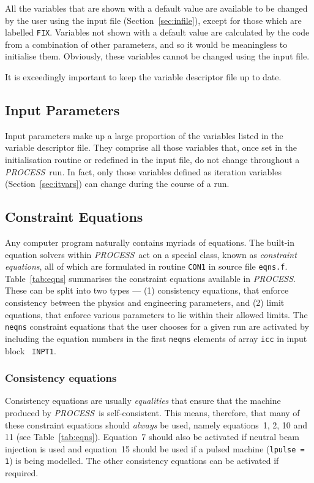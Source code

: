 \documentclass[11pt,a4paper]{report}
\makeatletter
\newcommand{\PS}{\mbox{\it PROCESS\/ }}
\newcommand{\PSD}{\mbox{\it PROCESS}\@.\/ }
\makeatother
\begin{document}
All the variables that are shown with a default value are available to be
changed by the user using the input file (Section~\ref{sec:infile}), except
for those which are labelled {\tt FIX}. Variables not shown with a default
value are calculated by the code from a combination of other parameters, and
so it would be meaningless to initialise them.  Obviously, these variables
cannot be changed using the input file.

It is exceedingly important to keep the variable descriptor file up to date.

\subsection{Input Parameters}
\label{sec:inpars}

Input parameters make up a large proportion of the variables listed in the
variable descriptor file. They comprise all those variables that, once set in
the initialisation routine or redefined in the input file, do not change
throughout a \PS run. In fact, only those variables defined as iteration
variables (Section~\ref{sec:itvars}) can change during the course of a run.

\subsection{Constraint Equations}
\label{sec:constraints}

Any computer program naturally contains myriads of equations. The built-in
equation solvers within \PS act on a special class, known as {\em constraint
equations}, all of which are formulated in routine {\tt CON1} in source file
{\tt eqns.f}. Table~\ref{tab:eqns} summarises the constraint equations
available in \PSD These can be split into two types --- (1) consistency
equations, that enforce consistency between the physics and engineering
parameters, and (2) limit equations, that enforce various parameters to lie
within their allowed limits. The {\tt neqns} constraint equations that the
user chooses for a given run are activated by including the equation numbers
in the first {\tt neqns} elements of array {\tt icc} in input block {\tt
INPT1}.

\subsubsection{Consistency equations}

Consistency equations are usually {\em equalities}\/ that ensure that the
machine produced by \PS is self-consistent. This means, therefore, that many
of these constraint equations should {\em always}\/ be used, namely
equations~1, 2, 10 and 11 (see Table~\ref{tab:eqns}).  Equation~7 should also
be activated if neutral beam injection is used and equation~15 should be used
if a pulsed machine ({\tt lpulse = 1}) is being modelled.  The other
consistency equations can be activated if required.
\end{document}
